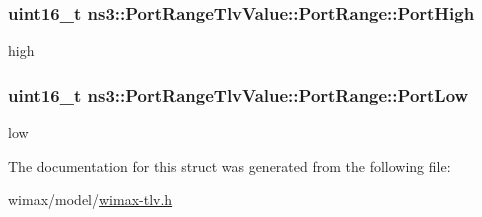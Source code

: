 \subsubsection[{\texorpdfstring{Port\+High}{PortHigh}}]{\setlength{\rightskip}{0pt plus 5cm}uint16\+\_\+t ns3\+::\+Port\+Range\+Tlv\+Value\+::\+Port\+Range\+::\+Port\+High}\hypertarget{structns3_1_1PortRangeTlvValue_1_1PortRange_af368bfb1f7b7b72e0a9d939421c5446a}{}\label{structns3_1_1PortRangeTlvValue_1_1PortRange_af368bfb1f7b7b72e0a9d939421c5446a}


high 

\subsubsection[{\texorpdfstring{Port\+Low}{PortLow}}]{\setlength{\rightskip}{0pt plus 5cm}uint16\+\_\+t ns3\+::\+Port\+Range\+Tlv\+Value\+::\+Port\+Range\+::\+Port\+Low}\hypertarget{structns3_1_1PortRangeTlvValue_1_1PortRange_af687aec99ac76c56c7d2c9bf789e39aa}{}\label{structns3_1_1PortRangeTlvValue_1_1PortRange_af687aec99ac76c56c7d2c9bf789e39aa}


low 



The documentation for this struct was generated from the following file\+:\begin{DoxyCompactItemize}
\item 
wimax/model/\hyperlink{wimax-tlv_8h}{wimax-\/tlv.\+h}\end{DoxyCompactItemize}
